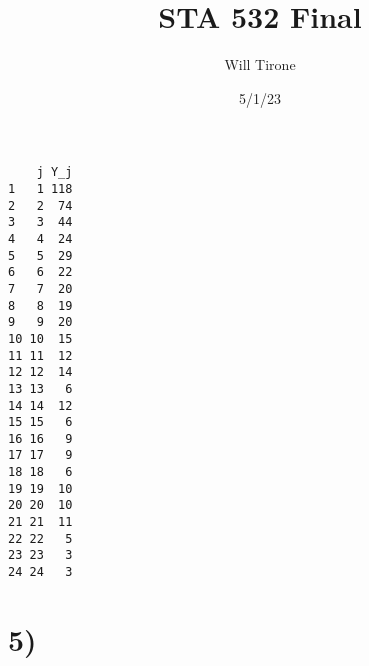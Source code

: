 \documentclass[
  letterpaper,
  DIV=11,
  numbers=noendperiod]{scrartcl}
\title{STA 532 Final}
\author{Will Tirone}
\date{5/1/23}
\begin{document}
\maketitle
\ifdefined\Shaded\renewenvironment{Shaded}{\begin{tcolorbox}[boxrule=0pt, interior hidden, sharp corners, frame hidden, enhanced, breakable, borderline west={3pt}{0pt}{shadecolor}]}{\end{tcolorbox}}\fi

\begin{verbatim}
    j Y_j
1   1 118
2   2  74
3   3  44
4   4  24
5   5  29
6   6  22
7   7  20
8   8  19
9   9  20
10 10  15
11 11  12
12 12  14
13 13   6
14 14  12
15 15   6
16 16   9
17 17   9
18 18   6
19 19  10
20 20  10
21 21  11
22 22   5
23 23   3
24 24   3
\end{verbatim}

\hypertarget{section}{%
\section{5)}\label{section}}
\end{document}
